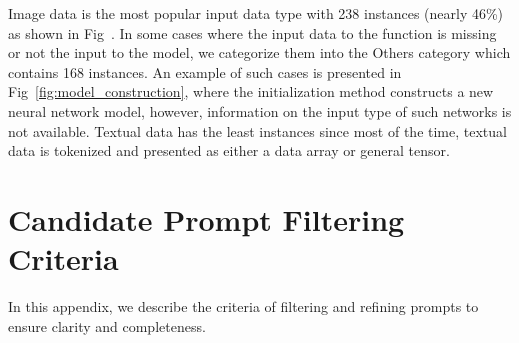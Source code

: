 Image data is the most popular input data type with 238 instances (nearly 46\%) as shown in Fig~. In some cases where the input data to the function is missing or not the input to the model, we categorize them into the Others category which contains 168 instances. An example of such cases is presented in Fig~\ref{fig:model_construction}, where the initialization method constructs a new neural network model, however, information on the input type of such networks is not available. Textual data has the least instances since most of the time, textual data is tokenized and presented as either a data array or general tensor.


\section{Candidate Prompt Filtering Criteria}
In this appendix, we describe the criteria of filtering and refining prompts to ensure clarity and completeness.

